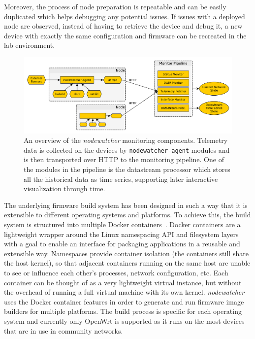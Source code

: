 \documentclass[5p,sort&compress]{elsarticle}
\newcommand{\nodewatcher}{\textit{nodewatcher}}
\begin{document}
Moreover, the process of node preparation is repeatable and can be easily duplicated which helps debugging any potential issues.
If issues with a deployed node are observed, instead of having to retrieve the device and debug it, a new device with exactly the same configuration and firmware can be recreated in the lab environment.

\begin{figure}
  \centering
  \includegraphics[scale=0.5]{figures/monitoring-pipeline.pdf}
  \caption{An overview of the \nodewatcher{} monitoring components. Telemetry data is collected on the devices by \texttt{nodewatcher-agent} modules and is then transported over HTTP to the monitoring pipeline. One of the modules in the pipeline is the datastream processor which stores all the historical data as time series, supporting later interactive visualization through time.}
  \label{fig:monitoring-pipeline}
\end{figure}

The underlying firmware build system has been designed in such a way that it is extensible to different operating systems and platforms.
To achieve this, the build system is structured into multiple Docker containers~\cite{Docker_2013}.
Docker containers are a lightweight wrapper around the Linux namespacing API and filesystem layers with a goal to enable an interface for packaging applications in a reusable and extensible way.
Namespaces provide container isolation (the containers still share the host kernel), so that adjacent containers running on the same host are unable to see or influence each other's processes, network configuration, etc.
Each container can be thought of as a very lightweight virtual instance, but without the overhead of running a full virtual machine with its own kernel.
\nodewatcher{} uses the Docker container features in order to generate and run firmware image builders for multiple platforms.
The build process is specific for each operating system and currently only OpenWrt is supported as it runs on the most devices that are in use in community networks.
\end{document}
